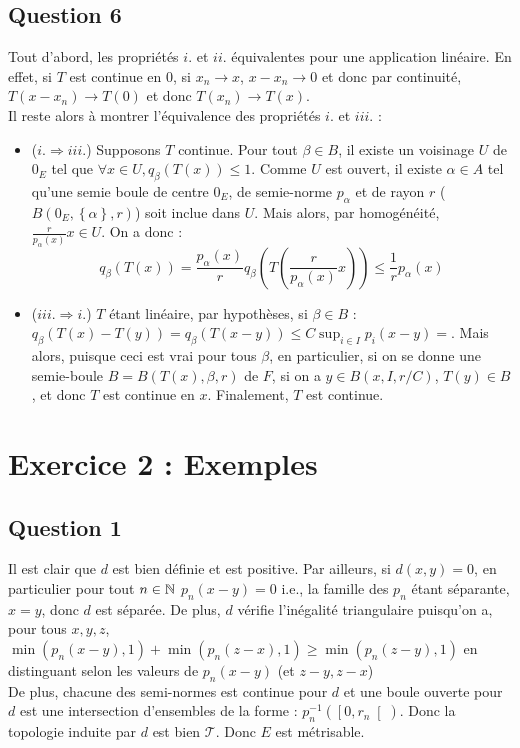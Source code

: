 \documentclass{cours}
\begin{document}
        \subsection{Question 6}
        Tout d'abord, les propriétés $i.$ et $ii.$ équivalentes pour une application linéaire. En effet, si $T$ est continue en $0$, si $x_{n} \to x$, $x - x_{n} \to 0$ et donc par continuité, $T(x - x_{n}) \to T(0)$ et donc $T(x_{n}) \to T(x)$. \\
            Il reste alors à montrer l'équivalence des propriétés $i.$ et $iii.$ : 
            \begin{itemize}
                \item ($i. \Rightarrow iii.$) Supposons $T$ continue. Pour tout $\beta \in B$, il existe un voisinage $U$ de $0_{E}$ tel que $\forall x \in U, q_{\beta}(T(x)) \leq 1$. Comme $U$ est ouvert, il existe $\alpha \in A$ tel qu'une semie boule de centre $0_{E}$, de semie-norme $p_{\alpha}$ et de rayon $r$ ($B(0_{E}, \left\{\alpha\right\}, r)$) soit inclue dans $U$. Mais alors, par homogénéité, $\frac{r}{p_{\alpha}(x)}x \in U$. On a donc : \[q_{\beta}(T(x)) = \frac{p_{\alpha}(x)}{r} q_{\beta}\left(T\left(\frac{r}{p_{\alpha}(x)}x\right)\right) \leq \frac{1}{r}p_{\alpha}(x)\]
                \item ($iii. \Rightarrow i.$) $T$ étant linéaire, par hypothèses, si $\beta \in B$ : $q_{\beta}(T(x) - T(y)) = q_{\beta}(T(x-y)) \leq C \sup_{i\in I} p_{i}(x - y) = $. Mais alors, puisque ceci est vrai pour tous $\beta$, en particulier, si on se donne une semie-boule $B = B(T(x), {\beta}, r)$ de $F$, si on a $y \in B(x, I, r/C)$, $T(y) \in B$, et donc $T$ est continue en $x$. Finalement, $T$ est continue.
            \end{itemize}

            
    \section{Exercice 2 : Exemples}
        \subsection{Question 1}
            Il est clair que $d$ est bien définie et est positive. Par ailleurs, si $d(x, y) = 0$, en particulier pour tout $n \in \mathbb{N}$ $p_{n}(x - y) = 0$ i.e., la famille des $p_{n}$ étant séparante, $x = y$, donc $d$ est séparée. De plus, $d$ vérifie l'inégalité triangulaire puisqu'on a, pour tous $x, y, z$, $\min(p_{n}(x - y), 1) + \min(p_{n}(z - x), 1) \geq \min(p_{n}(z - y), 1)$ en distinguant selon les valeurs de $p_{n}(x - y)$ (et $z - y, z - x$)\\
            De plus, chacune des semi-normes est continue pour $d$ et une boule ouverte pour $d$ est une intersection d'ensembles de la forme : $p_{n}^{-1}\left(\left[0, r_{n}\right[\right)$. Donc la topologie induite par $d$ est bien $\mathcal{T}$. Donc $E$ est métrisable. 
        
\end{document}
